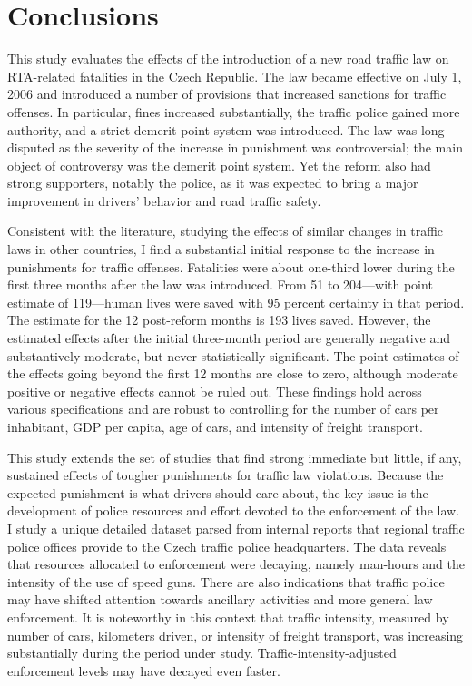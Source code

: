 \documentclass[12pt]{article}
\begin{document}
\section{Conclusions} %
\label{sec:conclusions} 

This study evaluates the effects of the introduction of a new road traffic law
on RTA-related fatalities in the Czech Republic. The law became effective on
July 1, 2006 and introduced a number of provisions that increased sanctions for
traffic offenses. In particular, fines increased substantially, the traffic
police gained more authority, and a strict demerit point system was introduced.
The law was long disputed as the severity of the increase in punishment was
controversial; the main object of controversy was the demerit point system.  Yet
the reform also had strong supporters, notably the police, as it was expected to
bring a major improvement in drivers' behavior and road traffic safety.

Consistent with the literature, studying the effects of similar changes in
traffic laws in other countries, I find a substantial initial response to the
increase in punishments for traffic offenses. Fatalities were about one-third
lower during the first three months after the law was introduced. From 51 to
204---with point estimate of 119---human lives were saved with 95 percent
certainty in that period. The estimate for the 12 post-reform months is 193
lives saved. However, the estimated effects after the initial three-month period
are generally negative and substantively moderate, but never statistically
significant. The point estimates of the effects going beyond the first 12
months are close to zero, although moderate positive or negative effects cannot
be ruled out. These findings hold across various specifications and are robust
to controlling for the number of cars per inhabitant, GDP per capita, age of
cars, and intensity of freight transport. 

This study extends the set of studies that find strong immediate but little, if
any, sustained effects of tougher punishments for traffic law violations.
Because the expected punishment is what drivers should care about, the key issue
is the development of police resources and effort devoted to the enforcement of
the law. I study a unique detailed dataset parsed from internal reports that
regional traffic police offices provide to the Czech traffic police
headquarters. The data reveals that resources allocated to enforcement were
decaying, namely man-hours and the intensity of the use of speed guns. There are
also indications that traffic police may have shifted attention towards
ancillary activities and more general law enforcement. It is noteworthy in this
context that traffic intensity, measured by number of cars, kilometers driven,
or intensity of freight transport, was increasing substantially during the
period under study. Traffic-intensity-adjusted enforcement levels may have
decayed even faster.
\end{document}
